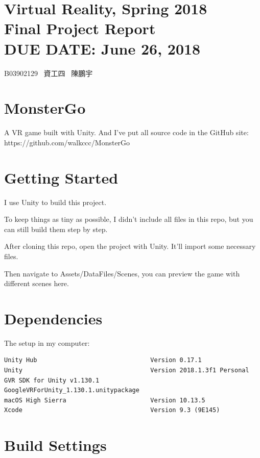 \documentclass{article}
\newcommand{\hmwkClass}{Virtual Reality, Spring 2018}
\newcommand{\hmwkTitle}{Final Project Report}
\newcommand{\hmwkDueDate}{June 26, 2018}
\begin{document}
\thispagestyle{empty}
\section*{\hmwkClass \\
    \normalsize{\hmwkTitle} \\
    \normalsize{DUE DATE: \hmwkDueDate}
}

\hfill{B03902129 \, 資工四 \, 陳鵬宇} \\

\section*{MonsterGo}

A VR game built with Unity. And I've put all source code in the GitHub site: https://github.com/walkccc/MonsterGo

\section*{Getting Started}

I use Unity to build this project.

To keep things as tiny as possible, I didn't include all files in this repo, but you can still build them step by step.

After cloning this repo, open the project with Unity. It'll import some necessary files.

Then navigate to Assets/DataFiles/Scenes, you can preview the game with different scenes here.

\section*{Dependencies}

The setup in my computer:

\begin{lstlisting}
Unity Hub                               Version 0.17.1
Unity                                   Version 2018.1.3f1 Personal
GVR SDK for Unity v1.130.1              GoogleVRForUnity_1.130.1.unitypackage
macOS High Sierra                       Version 10.13.5
Xcode                                   Version 9.3 (9E145)
\end{lstlisting}

\section*{Build Settings}
\end{document}
